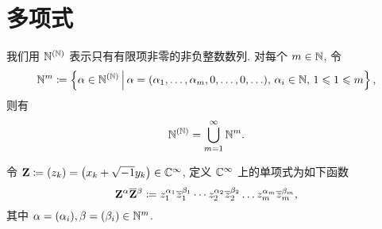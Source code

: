 \section{多项式}
我们用 $\mathbb{N}^{(\mathbb{N})}$ 表示只有有限项非零的非负整数数列. 对每个 $m\in\mathbb{N}$, 令
\[\nn^m\dy\jh{\alpha\in\nn^{(\nn)}}{\alpha=\xk{\alpha_1,\dots,\alpha_m,0,\dots,0,\dots},\,\alpha_i\in\nn,\,1\leq 1\leq m},\]
则有
\[\mathbb{N}^{\left(\mathbb{N}\right)}=\bigcup_{m=1}^\infty\mathbb{N}^m.\]
\begin{definition}[单项式]
令 $\mathbf{Z}\coloneqq\left(z_k\right)=\left(x_k+\sqrt{\smash{-}1} y_k\right)\in\mathbb{C}^\infty$, 定义 $\mathbb{C}^\infty$ 上的单项式为如下函数
\[\mathbf{Z}^\alpha\overline{\mathbf{Z}}{}^\beta\coloneqq z_1^{\alpha_1}\overline{z}{}_1^{\beta_1}\cdots z_2^{\alpha_2}\overline{z}{}_2^{\beta_2}\dots z_m^{\alpha_m}\overline{z}{}_m^{\beta_m},\]
其中 $\alpha=\xk{\alpha_i},\beta=\xk{\beta_i}\in\nn^m$.
\end{definition}

